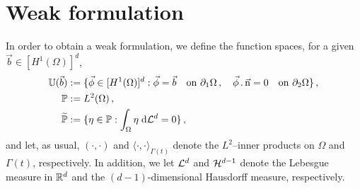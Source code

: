 \section{Weak formulation}\label{sec:stokes_weak}
In order to obtain a weak formulation, we define the function spaces, for a
given $\vec b \in [H^1(\Omega)]^d$,
\begin{align*}
\mathbb{U}(\vec{b}) &:= \{\vec \phi\in[H^1(\Omega)]^d:
\vec \phi =\vec b\quad \mbox{on }\partial_1\Omega\,,
\quad \vec \phi\,.\,\vec{\rm n}=0 \quad \mbox{on }\partial_2\Omega\}\,,\\
\mathbb{P} &:= L^2(\Omega)\,,\\
\widetilde{\mathbb{P}} &:= \{\eta\in\mathbb{P} : \int_\Omega\eta\;{\rm d}{\cal L}^{d}=0 \}\,,
\end{align*}
and let, as usual, $(\cdot,\cdot)$ and $\langle \cdot, \cdot
\rangle_{\Gamma(t)}$ denote the $L^2$--inner products on $\Omega$ and
$\Gamma(t)$, respectively. In addition, we let $\mathcal{L}^d$ and $\mathcal{H}^{d-1}$ denote the
Lebesgue measure in $\mathbb R^d$ and the $(d-1)$-dimensional Hausdorff measure,
respectively.

